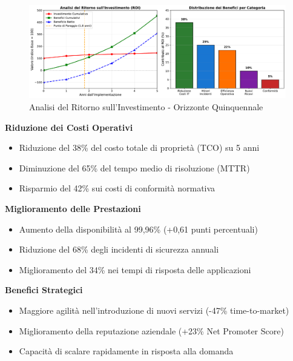 \begin{figure}[ht]
\centering
\includegraphics[width=1\textwidth]{thesis_figures/cap5/roi_analysis.pdf}
\caption{Analisi del Ritorno sull'Investimento - Orizzonte Quinquennale}
\label{fig:roi_analysis}
\end{figure}

\begin{tcolorbox}[
    colback=yellow!5!white,
    colframe=orange!75!black,
    title={\textbf{Benefici Quantificati - Sintesi Esecutiva}},
    fonttitle=\bfseries
]

\textbf{Riduzione dei Costi Operativi}
\begin{itemize}
    \item Riduzione del 38\% del costo totale di proprietà (TCO) su 5 anni
    \item Diminuzione del 65\% del tempo medio di risoluzione (MTTR)
    \item Risparmio del 42\% sui costi di conformità normativa
\end{itemize}

\textbf{Miglioramento delle Prestazioni}
\begin{itemize}
    \item Aumento della disponibilità al 99,96\% (+0,61 punti percentuali)
    \item Riduzione del 68\% degli incidenti di sicurezza annuali
    \item Miglioramento del 34\% nei tempi di risposta delle applicazioni
\end{itemize}

\textbf{Benefici Strategici}
\begin{itemize}
    \item Maggiore agilità nell'introduzione di nuovi servizi (-47\% time-to-market)
    \item Miglioramento della reputazione aziendale (+23\% Net Promoter Score)
    \item Capacità di scalare rapidamente in risposta alla domanda
\end{itemize}

\end{tcolorbox}

